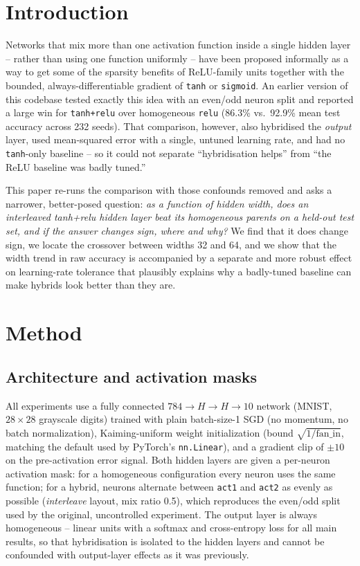 \documentclass[9pt]{extarticle}
\begin{document}
\section{Introduction}
Networks that mix more than one activation function inside a single hidden
layer -- rather than using one function uniformly -- have been proposed
informally as a way to get some of the sparsity benefits of ReLU-family
units together with the bounded, always-differentiable gradient of
\texttt{tanh} or \texttt{sigmoid}. An earlier version of this codebase tested
exactly this idea with an even/odd neuron split and reported a large win for
\texttt{tanh+relu} over homogeneous \texttt{relu} (86.3\% vs.\ 92.9\% mean
test accuracy across 232 seeds). That comparison, however, also hybridised
the \emph{output} layer, used mean-squared error with a single, untuned
learning rate, and had no \texttt{tanh}-only baseline -- so it could not
separate ``hybridisation helps'' from ``the ReLU baseline was badly tuned.''

This paper re-runs the comparison with those confounds removed and asks a
narrower, better-posed question: \emph{as a function of hidden width, does an
interleaved tanh+relu hidden layer beat its homogeneous parents on a held-out
test set, and if the answer changes sign, where and why?} We find that it
does change sign, we locate the crossover between widths 32 and 64, and we
show that the width trend in raw accuracy is accompanied by a separate and
more robust effect on learning-rate tolerance that plausibly explains why a
badly-tuned baseline can make hybrids look better than they are.

\section{Method}

\subsection{Architecture and activation masks}
All experiments use a fully connected \(784 \rightarrow H \rightarrow H
\rightarrow 10\) network (MNIST, \(28\times28\) grayscale digits) trained
with plain batch-size-1 SGD (no momentum, no batch normalization), Kaiming-uniform
weight initialization (bound \(\sqrt{1/\mathrm{fan\_in}}\), matching the
default used by PyTorch's \texttt{nn.Linear}), and a gradient clip of
\(\pm 10\) on the pre-activation error signal. Both hidden layers are given a
per-neuron activation mask: for a homogeneous configuration every neuron uses
the same function; for a hybrid, neurons alternate between \texttt{act1} and
\texttt{act2} as evenly as possible (\emph{interleave} layout, mix ratio
0.5), which reproduces the even/odd split used by the original, uncontrolled
experiment. The output layer is always homogeneous -- linear units with a
softmax and cross-entropy loss for all main results, so that hybridisation is
isolated to the hidden layers and cannot be confounded with output-layer
effects as it was previously.
\end{document}
